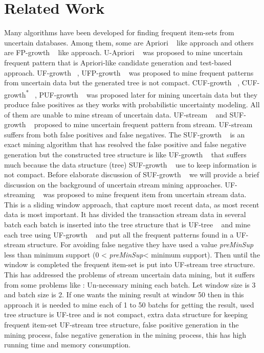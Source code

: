 \documentclass[conference]{IEEEtran}
\begin{document}
\section{Related Work}

Many algorithms have been developed for finding frequent item-sets from uncertain databases. Among them, some are Apriori ~\cite{apriori} like approach and others are FP-growth ~\cite{fp_growth} like approach. U-Apriori ~\cite{u_priori} was proposed to mine uncertain frequent pattern that is Apriori-like candidate generation and test-based approach. UF-growth ~\cite{uf_growth}, UFP-growth ~\cite{ufp_growth} was proposed to mine frequent patterns from uncertain data but the generated tree is not compact. CUF-growth ~\cite{cuf_growth}, CUF-growth\textsuperscript{*} ~\cite{cuf_growth}, PUF-growth ~\cite{cuf_growth} was proposed later for mining uncertain data but they produce false positives as they works with probabilistic uncertainty modeling. All of them are unable to mine stream of uncertain data. UF-stream ~\cite{suf_growth} and SUF-growth ~\cite{suf_growth} proposed to mine uncertain frequent pattern from stream. UF-stream ~\cite{suf_growth} suffers from both false positives and false negatives. The SUF-growth ~\cite{suf_growth} is an exact mining algorithm that has resolved the false positive and false negative generation but the constructed tree structure is like UF-growth ~\cite{uf_growth} that suffers much because the data structure (tree) SUF-growth ~\cite{suf_growth} use to keep information is not compact. Before elaborate discussion of SUF-growth ~\cite{suf_growth} we will provide a brief discussion on the background of uncertain stream mining approaches.
 UF-streaming ~\cite{suf_growth} was proposed to mine frequent item from uncertain stream data. This is a sliding window approach, that capture most recent data, as most recent data is most important. It has divided the transaction stream data in several batch each batch is inserted into the tree structure that is UF-tree ~\cite{uf_growth} and mine each tree using UF-growth ~\cite{uf_growth} and put all the frequent patterns found in a UF-stream structure. For avoiding false negative they have used a value \emph{preMinSup} less than minimum support (0 < \emph{preMinSup}< minimum support). Then until the window is completed the frequent item-set is put into UF-stream tree structure. This has addressed the problems of stream uncertain data mining, but it suffers from some problems like : Un-necessary mining each batch. Let window size is 3 and batch size is 2. If one wants the mining result at window 50 then in this approach it is needed to mine each of 1 to 50 batchs for getting the result, used tree structure is UF-tree and is not compact, extra data structure for keeping frequent item-set UF-stream tree structure, false positive generation in the mining process, false negative generation in the mining process, this has high running time and memory consumption.    
\end{document}

